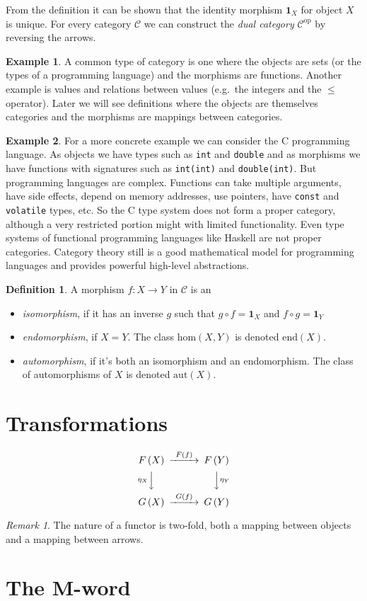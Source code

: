 \documentclass[11pt,a4paper]{scrartcl}
\newcommand{\of}[1]{\left(#1\right)}
\newcommand{\cdef}[1]{\emph{#1}}
\newcommand{\idm}[1]{\mathbf{1}_{#1}}
\theoremstyle{plain}
\theoremstyle{definition}
\newtheorem{defn}{Definition}
\newtheorem{exmp}{Example}
\theoremstyle{remark}
\newtheorem*{remark}{Remark}
\begin{document}
From the definition it can be shown that the identity morphism $\idm{X}$ for object $X$ is unique. For every category $\mathcal C$ we can construct the \cdef{dual category} $\mathcal{C}^\text{op}$ by reversing the arrows.

\begin{exmp}
	A common type of category is one where the objects are sets (or the types of a programming language) and the morphisms are functions. Another example is values and relations between values (e.g.\ the integers and the $\leq$ operator). Later we will see definitions where the objects are themselves categories and the morphisms are mappings between categories.
\end{exmp}
\begin{exmp}
	For a more concrete example we can consider the C programming language. As objects we have types such as \texttt{int} and \texttt{double} and as morphisms we have functions with signatures such as \texttt{int(int)} and \texttt{double(int)}. But programming languages are complex. Functions can take multiple arguments, have side effects, depend on memory addresses, use pointers, have \texttt{const} and \texttt{volatile} types, etc. So the C type system does not form a proper category, although a very restricted portion might with limited functionality. Even type systems of functional programming languages like Haskell are not proper categories. Category theory still is a good mathematical model for programming languages and provides powerful high-level abstractions.
\end{exmp}

\begin{defn}
A morphism $f\colon X \to Y$ in $\mathcal C$ is an
\begin{itemize}
	\item \cdef{isomorphism}, if it has an inverse $g$ such that $g\circ f = \idm{X}$ and $f\circ g = \idm{Y}$
	\item \cdef{endomorphism}, if $X = Y$. The class $\text{hom}(X, Y)$ is denoted $\text{end}(X)$.
	\item \cdef{automorphism}, if it's both an isomorphism and an endomorphism. The class of automorphisms of $X$ is denoted $\text{aut}(X)$.
\end{itemize}
\end{defn}

\section{Transformations}

\begin{displaymath}
\begin{CD}
	F\of X @>{F\of f}>> F\of Y \\
	@V{\eta_X}VV @VV{\eta_Y}V \\
	G\of X @>{G\of f}>> G\of Y
\end{CD}
\end{displaymath}

\begin{remark}
The nature of a functor is two-fold, both a mapping between objects and a mapping between arrows.
\end{remark}

\section{The M-word}
\end{document}
